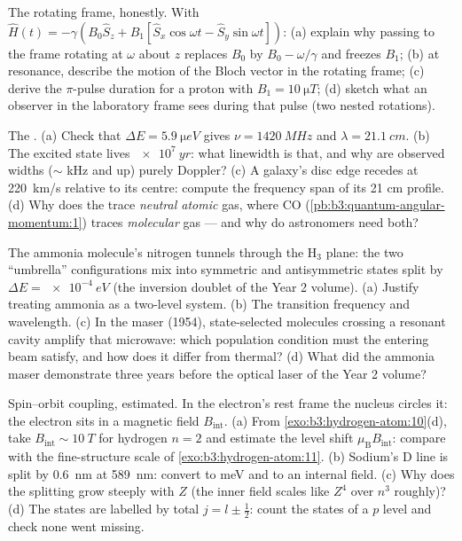 \begin{exercise}[$\star\star$]\label{exo:b3:spin-two-level:7}
The rotating frame, honestly. With $\hat H(t) = -\gamma(B_0\hat S_z
+ B_1[\hat S_x\cos\omega t - \hat S_y\sin\omega t])$: (a) explain
why passing to the frame rotating at $\omega$ about $z$ replaces
$B_0$ by $B_0 - \omega/\gamma$ and freezes $B_1$; (b) at resonance,
describe the motion of the Bloch vector in the rotating frame; (c)
derive the $\pi$-pulse duration for a proton with $B_1 =
\qty{10}{\micro T}$; (d) sketch what an observer in the laboratory
frame sees during that pulse (two nested rotations).
\end{exercise}

\begin{exercise}[$\star\star$]\label{exo:b3:spin-two-level:8}
The . (a) Check that $\Delta E = \qty{5.9}{\micro eV}$
gives $\nu = \qty{1420}{MHz}$ and $\lambda = \qty{21.1}{cm}$. (b)
The excited state lives $\qty{e7}{yr}$: what linewidth is that, and
why are observed widths ($\sim$ kHz and up) purely Doppler? (c) A
galaxy's disc edge recedes at \qty{220}{km/s} relative to its
centre: compute the frequency span of its 21 cm profile. (d) Why
does the  trace \emph{neutral atomic} gas, where CO
(\cref{pb:b3:quantum-angular-momentum:1}) traces \emph{molecular}
gas --- and why do astronomers need both?
\end{exercise}

\begin{exercise}[$\star\star$]\label{exo:b3:spin-two-level:9}
The ammonia molecule's nitrogen tunnels through the H$_3$ plane:
the two ``umbrella'' configurations mix into symmetric and
antisymmetric states split by $\Delta E = \qty{e-4}{eV}$ (the
inversion doublet of the Year 2 volume). (a) Justify treating
ammonia as a two-level system. (b) The transition frequency and
wavelength. (c) In the maser (1954), state-selected molecules
crossing a resonant cavity amplify that microwave: which population
condition must the entering beam satisfy, and how does it differ
from thermal? (d) What did the ammonia maser demonstrate three
years before the optical laser of the Year 2 volume?
\end{exercise}

\begin{exercise}[$\star\star\star$]\label{exo:b3:spin-two-level:10}
Spin--orbit coupling, estimated. In the electron's rest frame the
nucleus circles it: the electron sits in a magnetic field $B_{\text
{int}}$. (a) From \cref{exo:b3:hydrogen-atom:10}(d), take
$B_{\text{int}} \sim \qty{10}{T}$ for hydrogen $n = 2$ and estimate
the level shift $\mu_{\text{B}}B_{\text{int}}$: compare with the
fine-structure scale of \cref{exo:b3:hydrogen-atom:11}. (b) Sodium's
D line is split by \qty{0.6}{nm} at \qty{589}{nm}: convert to meV
and to an internal field. (c) Why does the splitting grow steeply
with $Z$ (the inner field scales like $Z^4$ over $n^3$ roughly)?
(d) The states are labelled by total $j = l \pm \tfrac12$: count the
states of a $p$ level and check none went missing.
\end{exercise}

